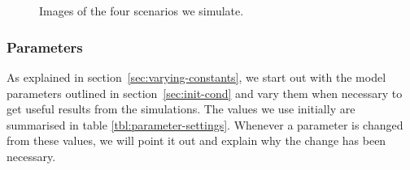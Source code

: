 \begin{figure}[h]
    \centering
    \begin{minipage}{0.45\textwidth}
        \centering
        \\
        \subfloat[Corridor.]{
        \resizebox{\textwidth}{!}{}
        \label{subfig:image-corridor}
        }
    \end{minipage}
    \begin{minipage}{0.45\textwidth}
        \centering
        \vspace{1.4cm}
        \subfloat[Bottleneck.]{
            \resizebox{\textwidth}{!}{}
            \label{subfig:image-bottleneck}
        }\\
        \vspace{6mm}
    \end{minipage}
    \caption{Images of the four scenarios we simulate.}
    \label{fig:fourcases}
\end{figure}

\subsubsection{Parameters}
As explained in section~\ref{sec:varying-constants}, we start out with the 
model parameters outlined in section~\ref{sec:init-cond} and vary them when 
necessary to get useful results from the simulations.  The values we use 
initially are summarised in table \ref{tbl:parameter-settings}. Whenever a 
parameter is changed from these values, we will point it out and explain why 
the change has been necessary.

